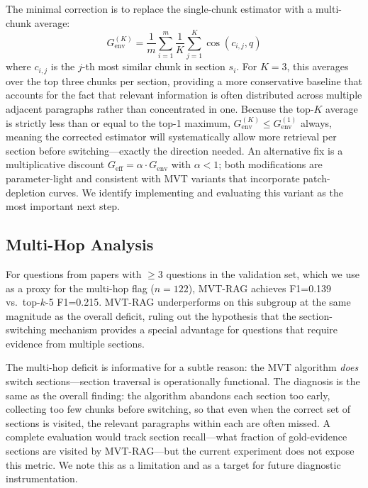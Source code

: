 \documentclass[11pt,letterpaper]{article}
\begin{document}
The minimal correction is to replace the single-chunk estimator with a multi-chunk average:
\begin{equation}
  G_{\mathrm{env}}^{(K)} = \frac{1}{m} \sum_{i=1}^{m} \frac{1}{K} \sum_{j=1}^{K} \cos(c_{i,j}, q)
\end{equation}
where $c_{i,j}$ is the $j$-th most similar chunk in section $s_i$. For $K=3$, this averages over the top three chunks
per section, providing a more conservative baseline that accounts for the fact that relevant information is often
distributed across multiple adjacent paragraphs rather than concentrated in one. Because the top-$K$ average is
strictly less than or equal to the top-1 maximum, $G_{\mathrm{env}}^{(K)} \leq G_{\mathrm{env}}^{(1)}$ always,
meaning the corrected estimator will systematically allow more retrieval per section before switching---exactly the
direction needed. An alternative fix is a multiplicative discount $G_{\mathrm{eff}} = \alpha \cdot G_{\mathrm{env}}$
with $\alpha < 1$; both modifications are parameter-light and consistent with MVT variants that incorporate
patch-depletion curves. We identify implementing and evaluating this variant as the most important next step.

\subsection{Multi-Hop Analysis}

For questions from papers with $\geq$3 questions in the validation set, which we use as a proxy for the multi-hop flag
($n=122$), MVT-RAG achieves F1=0.139 vs.\ top-$k$-5 F1=0.215. MVT-RAG underperforms on this subgroup at the same
magnitude as the overall deficit, ruling out the hypothesis that the section-switching mechanism provides a special
advantage for questions that require evidence from multiple sections.

The multi-hop deficit is informative for a subtle reason: the MVT algorithm \emph{does} switch sections---section
traversal is operationally functional. The diagnosis is the same as the overall finding: the algorithm abandons each
section too early, collecting too few chunks before switching, so that even when the correct set of sections is
visited, the relevant paragraphs within each are often missed. A complete evaluation would track section recall---what
fraction of gold-evidence sections are visited by MVT-RAG---but the current experiment does not expose this metric. We
note this as a limitation and as a target for future diagnostic instrumentation.
\end{document}

